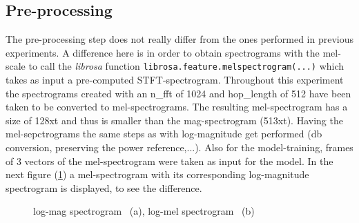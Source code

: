 \subsection{Pre-processing}
The pre-processing step does not really differ from the ones performed in previous experiments. A difference here is in order to obtain spectrograms with the mel-scale to call the \textit{librosa} function \texttt{librosa.feature.melspectrogram(...)} which takes as input a pre-computed STFT-spectrogram. Throughout this experiment the spectrograms created with an n\_fft of 1024 and hop\_length of 512 have been taken to be converted to mel-spectrograms. The resulting mel-spectrogram has a size of 128xt and thus is smaller than the mag-spectrogram (513xt). Having the mel-sepctrograms the same steps as with log-magnitude get performed (db conversion, preserving the power reference,...). Also for the model-training, frames of 3 vectors of the mel-spectrogram were taken as input for the model. In the next figure (\ref{fig:exp_mag_mel}) a mel-spectrogram with its corresponding log-magnitude spectrogram is displayed, to see the difference.

\begin{figure}[htb!]
    \centering
    \caption{log-mag spectrogram ~(a), log-mel spectrogram ~(b)}
    \label{fig:exp_mag_mel}
\end{figure}

